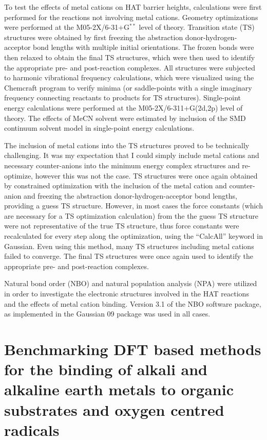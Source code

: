 To test the effects of metal cations on HAT barrier heights, calculations were first performed for the reactions not involving metal cations. Geometry optimizations were performed at the M05-2X\cite{Zhao2006}/6-31+G$^{**}$ level of theory. Transition state (TS) structures were obtained by first freezing the abstraction donor-hydrogen-acceptor bond lengths with multiple initial orientations. The frozen bonds were then relaxed to obtain the final TS structures, which were then used to identify the appropriate pre- and post-reaction complexes. All structures were subjected to harmonic vibrational frequency calculations, which were visualized using the Chemcraft program\cite{ccraft} to verify minima (or saddle-points with a single imaginary frequency connecting reactants to products for TS structures). Single-point energy calculations were performed at the M05-2X/6-311+G(2d,2p) level of theory. The effects of MeCN solvent were estimated by inclusion of the SMD\cite{Marenich2009} continuum solvent model in single-point energy calculations.

The inclusion of metal cations into the TS structures proved to be technically challenging. It was my expectation that I could simply include metal cations and necessary counter-anions into the minimum energy complex structures and re-optimize, however this was not the case. TS structures were once again obtained by constrained optimization with the inclusion of the metal cation and counter-anion and freezing the abstraction donor-hydrogen-acceptor bond lengths, providing a guess TS structure. However, in most cases the force constants (which are necessary for a TS optimization calculation) from the the guess TS structure were not representative of the true TS structure, thus force constants were recalculated for every step along the optimization, using the ``CalcAll'' keyword in Gaussian. Even using this method, many TS structures including metal cations failed to converge. The final TS structures were once again used to identify the appropriate pre- and post-reaction complexes.

Natural bond order (NBO) and natural population analysis (NPA) were utilized in order to investigate the electronic structures involved in the HAT reactions and the effects of metal cation binding.\cite{Reed1983, Reed1985, Glendening2012} Version 3.1 of the NBO software package,\cite{NBO3} as implemented in the Gaussian 09 package was used in all cases.\cite{Frisch2009}

\section{Benchmarking DFT based methods for the binding of alkali and alkaline earth metals to organic substrates and oxygen centred radicals}
\label{sec:benchmark}

